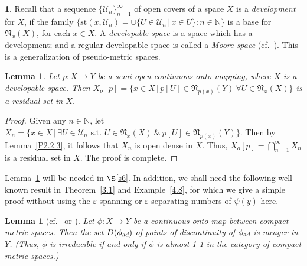 \documentclass[12pt,final,3p,times]{elsarticle}
\newtheorem{slem}[sthm]{Lemma}
\theoremstyle{definition}
\newtheorem{sse}[sthm]{}
\numberwithin{equation}{section}
\begin{document}
\begin{sse}
Recall that a sequence $\{\mathscr{U}_n\}_{n=1}^\infty$ of open covers of a space $X$ is a \textit{development} for $X$, if the family $\{\textrm{st}(x,\mathscr{U}_n)=\cup\{U\in\mathscr{U}_n\,|\,x\in U\}\colon n\in\mathbb{N}\}$ is a base for $\mathfrak{N}_x(X)$, for each $x\in X$. A \textit{developable space} is a space which has a development; and a regular developable space is called a \textit{Moore space} (cf.~\cite[Def.~1.3]{G84}). This is a generalization of pseudo-metric spaces.
\end{sse}

\begin{slem}\label{P2.2.7}
Let $p\colon X\rightarrow Y$ be a semi-open continuous onto mapping, where $X$ is a developable space. Then
$X_o[p]=\{x\in X\,|\,p[U]\in\mathfrak{N}_{p(x)}(Y)\ \forall U\in\mathfrak{N}_x(X)\}$ is a residual set in $X$.
\end{slem}

\begin{proof}
Given any $n\in\mathbb{N}$, let $X_n=\{x\in X\,|\,\exists U\in\mathscr{U}_n\textrm{ s.t. } U\in\mathfrak{N}_x(X)\ \&\ p[U]\in\mathfrak{N}_{p(x)}(Y)\}$. Then by Lemma~\ref{P2.2.3}, it follows that $X_n$ is open dense in $X$. Thus, $X_o[p]=\bigcap_{n=1}^\infty X_n$ is a residual set in $X$. The proof is complete.
\end{proof}

Lemma~\ref{P2.2.7} will be needed in $\S$\ref{s6}. In addition, we shall need the following well-known result in Theorem~\ref{3.1} and Example~\ref{4.8}, for which we give a simple proof without using the $\varepsilon$-spanning or $\varepsilon$-separating numbers of $\psi(y)$ here.

\begin{slem}[{cf.~\cite[Thm.~II.1.3e]{Wo} or \cite[Lem.~14.44]{A88}}]\label{P2.2.8}
Let $\phi\colon X\rightarrow Y$ be a continuous onto map between compact metric spaces. Then the set $D(\phi_{\textsl{ad}})$ of points of discontinuity of $\phi_\textsl{ad}$
is meager in $Y$. (Thus, $\phi$ is irreducible if and only if $\phi$ is almost 1-1 in the category of compact metric spaces.)
\end{slem}
\end{document}
